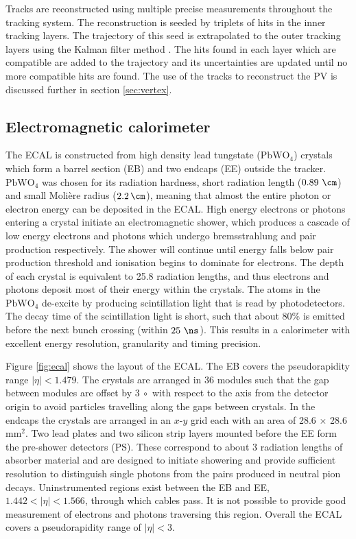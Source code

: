Tracks are reconstructed using multiple precise measurements throughout the
tracking system. The reconstruction is seeded by triplets of hits in the inner
tracking layers. The trajectory of this seed is extrapolated to the outer tracking
layers using the Kalman filter method \cite{Fruhwirth:1987fm}. The hits found in each layer
which are compatible are added to the trajectory and its uncertainties are
updated until no more compatible hits are found. The use of the tracks to
reconstruct the \ac{PV} is discussed further in section \ref{sec:vertex}.

\subsection{Electromagnetic calorimeter}
\label{sec:ecal}

The \ac{ECAL} is constructed from high density lead tungstate
($\mathrm{PbWO_{4}}$) crystals which form a barrel section (EB) 
and two endcaps (EE) outside the tracker. $\mathrm{PbWO_{4}}$ was chosen for its
radiation hardness, short radiation length ($0.89~\cm$) and small Moli\`ere
radius ($2.2\,\cm$), meaning that almost the entire photon or electron energy
can be deposited in the \ac{ECAL}. High energy electrons or photons
entering a crystal initiate an electromagnetic shower, which produces a cascade
of low energy electrons and photons which undergo bremsstrahlung and pair
production respectively. The shower will continue until energy falls below pair
production threshold and ionisation begins to dominate for electrons. 
The depth of each crystal is equivalent to 25.8 radiation lengths, and
thus electrons and photons deposit most of their energy within the crystals.
The atoms in the $\mathrm{PbWO_{4}}$ de-excite by producing scintillation light that is read by
photodetectors. The decay time of the scintillation light is short, such that
about 80\% is emitted before the next bunch crossing (within $25~\ns$). This
results in a calorimeter with excellent energy resolution, granularity and timing
precision.

Figure \ref{fig:ecal} shows the layout of the \ac{ECAL}. The EB covers the
pseudorapidity range $|\eta|<1.479$. The crystals are arranged in 36 modules such
that the gap between modules are offset by $3~\circ$ with respect to the axis
from the detector origin to avoid particles travelling along the gaps between
crystals. In
the endcaps the crystals are arranged in an $x$-$y$ grid each with an area of
28.6$\,\times\,$28.6 $\mathrm{mm^{2}}$. Two lead plates and two silicon strip
layers mounted before the EE form the pre-shower detectors (PS). These correspond to about
$3$ radiation lengths of absorber material and are designed to initiate
showering and provide sufficient resolution to distinguish single photons from
the pairs produced in neutral pion decays. Uninstrumented regions exist
between the EB and EE, $1.442 < |\eta| < 1.566$, through which cables pass. It
is not possible to provide good measurement of electrons and photons traversing
this region. Overall the \ac{ECAL} covers a pseudorapidity range of $|\eta|<3$.

